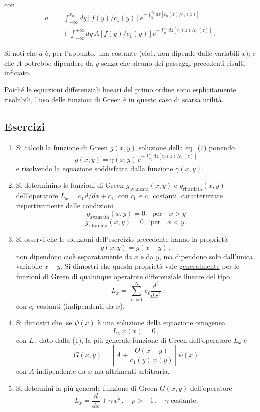 \documentclass[11pt, a4paper]{book}
\numberwithin{equation}{section}
\newenvironment{esercizi}{\subsection*{Esercizi}\begin{enumerate}}{\end{enumerate}}
\begin{document}
con
\begin{align*}
a &= \int_{-\infty}^{x_0} dy \left[ f(y)/c_1(y) \right]
     e^{\displaystyle -\int_{y}^{x_0} dz \left[ c_0(z)/c_1(z) \right]} \\
  &\quad + \int_{-\infty}^{+\infty} dy \, A \left[ f(y)/c_1(y) \right]
     e^{\displaystyle -\int_{y}^{x_0} dz \left[ c_0(z)/c_1(z) \right]} \,.
\end{align*}

Si noti che $a$ è, per l'appunto, una costante (cioè, non dipende dalle variabili $x$); e che $A$ potrebbe dipendere da $y$ senza che alcuno dei passaggi precedenti risulti inficiato.

Poiché le equazioni differenziali lineari del primo ordine sono esplicitamente risolubili, l'uso delle funzioni di Green è in questo caso di scarsa utilità.

\begin{esercizi}

\item Si calcoli la funzione di Green $g(x,y)$ soluzione della eq.~(7) ponendo
\[
    g(x,y) = \gamma(x,y) \, e^{\displaystyle -\int_{x_0}^{x} dz \left[ c_0(z)/c_1(z) \right]}
\]
e risolvendo la equazione soddisfatta dalla funzione $\gamma(x,y)$.

\item Si determinino le funzioni di Green $g_{\text{avanzata}}(x,y)$ e $g_{\text{ritardata}}(x,y)$ dell'operatore $L_x = c_0 \, d/dx + c_1$, con $c_0$ e $c_1$ costanti, caratterizzate rispettivamente dalle condizioni
\[
    g_{\text{avanzata}}(x,y) = 0 \quad \text{per} \quad x > y
\]
\[
    g_{\text{ritardata}}(x,y) = 0 \quad \text{per} \quad x < y \,.
\]

\item Si osservi che le soluzioni dell'esercizio precedente hanno la proprietà
\[
    g(x,y) = g(x-y) \,,
\]
non dipendono cioè separatamente da $x$ e da $y$, ma dipendono solo dall'unica variabile $x-y$. Si dimostri che questa proprietà vale \underline{generalmente} per le funzioni di Green di qualunque operatore differenziale lineare del tipo
\[
    L_x = \sum_{\ell=0}^{N} c_\ell \frac{d^\ell}{dx^\ell}
\]
con $c_\ell$ costanti (indipendenti da $x$).

\item Si dimostri che, se $\psi(x)$ è una soluzione della equazione omogenea
\[
    L_x \, \psi(x) = 0 \,,
\]
con $L_x$ dato dalla (1), la più generale funzione di Green dell'operatore $L_x$ è
\[
    G(x,y) = \left[ A + \frac{\Theta(x-y)}{c_1(y)\,\psi(y)} \right] \psi(x)
\]
con $A$ indipendente da $x$ ma altrimenti arbitraria.

\item Si determini la più generale funzione di Green $G(x,y)$ dell'operatore
\[
    L_x = \frac{d}{dx} + \gamma \, x^p \,, \quad p > -1 \,, \quad \gamma \text{ costante.}
\]

\end{esercizi}
\end{document}
